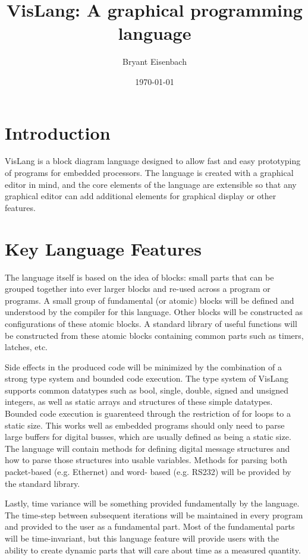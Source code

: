 \documentclass[dvips,12pt]{article}
\begin{document}
\title{VisLang: A graphical programming language}
\author{Bryant Eisenbach}
\date{\today}
\maketitle

\section{Introduction}

VisLang is a block diagram language designed to allow fast and
easy prototyping of programs for embedded processors. The language is created
with a graphical editor in mind, and the core elements of the language are
extensible so that any graphical editor can add additional elements for
graphical display or other features.

\section{Key Language Features}

The language itself is based on the idea of blocks: small parts that can be grouped
together into ever larger blocks and re-used across a program or programs. A small
group of fundamental (or atomic) blocks will be defined and understood by the
compiler for this language. Other blocks will be constructed as configurations of
these atomic blocks. A standard library of useful functions will be constructed
from these atomic blocks containing common parts such as timers, latches, etc.

Side effects in the produced code will be minimized by the combination of a strong
type system and bounded code execution. The type system of VisLang supports common
datatypes such as bool, single, double, signed and unsigned integers, as well as
static arrays and structures of these simple datatypes. Bounded code execution is
guarenteed through the restriction of for loops to a static size. This works well
as embedded programs should only need to parse large buffers for digital busses,
which are usually defined as being a static size. The language will contain methods
for defining digital message structures and how to parse those structures into
usable variables. Methods for parsing both packet-based (e.g. Ethernet) and word-
based (e.g. RS232) will be provided by the standard library.

Lastly, time variance will be something provided fundamentally by the language.
The time-step between subsequent iterations will be maintained in every program
and provided to the user as a fundamental part. Most of the fundamental parts
will be time-invariant, but this language feature will provide users with the
ability to create dynamic parts that will care about time as a measured quantity.
\end{document}
